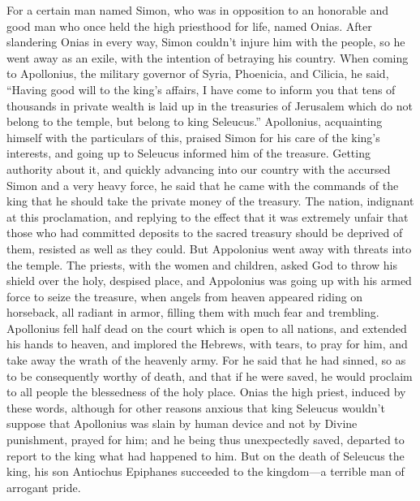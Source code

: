  For a certain man named Simon, who was in opposition to
an honorable and good man who once held the high priesthood for life,
named Onias. After slandering Onias in every way, Simon couldn't injure
him with the people, so he went away as an exile, with the intention of
betraying his country.  When coming to Apollonius, the
military governor of Syria, Phoenicia, and Cilicia, he said,
 ``Having good will to the king's affairs, I have come to
inform you that tens of thousands in private wealth is laid up in the
treasuries of Jerusalem which do not belong to the temple, but belong to
king Seleucus.''  Apollonius, acquainting himself with the
particulars of this, praised Simon for his care of the king's interests,
and going up to Seleucus informed him of the treasure. 
Getting authority about it, and quickly advancing into our country with
the accursed Simon and a very heavy force,  he said that
he came with the commands of the king that he should take the private
money of the treasury.  The nation, indignant at this
proclamation, and replying to the effect that it was extremely unfair
that those who had committed deposits to the sacred treasury should be
deprived of them, resisted as well as they could.  But
Appolonius went away with threats into the temple.  The
priests, with the women and children, asked God to throw his shield over
the holy, despised place,  and Appolonius was going up
with his armed force to seize the treasure, when angels from heaven
appeared riding on horseback, all radiant in armor, filling them with
much fear and trembling.  Apollonius fell half dead on
the court which is open to all nations, and extended his hands to
heaven, and implored the Hebrews, with tears, to pray for him, and take
away the wrath of the heavenly army.  For he said that he
had sinned, so as to be consequently worthy of death, and that if he
were saved, he would proclaim to all people the blessedness of the holy
place.  Onias the high priest, induced by these words,
although for other reasons anxious that king Seleucus wouldn't suppose
that Apollonius was slain by human device and not by Divine punishment,
prayed for him;  and he being thus unexpectedly saved,
departed to report to the king what had happened to him. 
But on the death of Seleucus the king, his son Antiochus Epiphanes
succeeded to the kingdom---a terrible man of arrogant pride.

